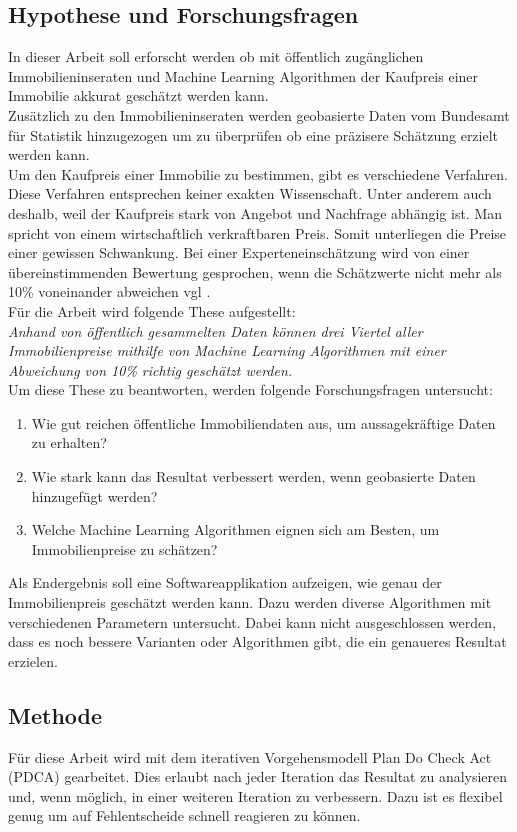 \subsection{Hypothese und Forschungsfragen}
In dieser Arbeit soll erforscht werden ob mit öffentlich zugänglichen Immobilieninseraten und Machine Learning Algorithmen der Kaufpreis einer Immobilie akkurat geschätzt werden kann.\\
Zusätzlich zu den Immobilieninseraten werden geobasierte Daten vom Bundesamt für Statistik hinzugezogen um zu überprüfen ob eine präzisere Schätzung erzielt werden kann.\\[2ex]
%
Um den Kaufpreis einer Immobilie zu bestimmen, gibt es verschiedene Verfahren. Diese Verfahren entsprechen keiner exakten Wissenschaft. Unter anderem auch deshalb, weil der Kaufpreis stark von Angebot und Nachfrage abhängig ist. Man spricht von einem wirtschaftlich verkraftbaren Preis. Somit unterliegen die Preise einer gewissen Schwankung. Bei einer Experteneinschätzung wird von einer übereinstimmenden Bewertung gesprochen, wenn die Schätzwerte nicht mehr als 10\% voneinander abweichen vgl \cite{immo_1, immo_2}.\\[2ex]
%
Für die Arbeit wird folgende These aufgestellt:\\[2ex]
\textit{Anhand von öffentlich gesammelten Daten können drei Viertel aller Immobilienpreise mithilfe von Machine Learning Algorithmen mit einer Abweichung von 10\% richtig geschätzt werden.}\\[4ex]
%
Um diese These zu beantworten, werden folgende Forschungsfragen untersucht:
\begin{enumerate}
\item Wie gut reichen öffentliche Immobiliendaten aus, um aussagekräftige Daten zu erhalten?
\item Wie stark kann das Resultat verbessert werden, wenn geobasierte Daten hinzugefügt werden?
\item Welche Machine Learning Algorithmen eignen sich am Besten, um Immobilienpreise zu schätzen?
\end{enumerate}
Als Endergebnis soll eine Softwareapplikation aufzeigen, wie genau der Immobilienpreis geschätzt werden kann. Dazu werden diverse Algorithmen mit verschiedenen Parametern untersucht. Dabei kann nicht ausgeschlossen werden, dass es noch bessere Varianten oder Algorithmen gibt, die ein genaueres Resultat erzielen.
%
\subsection{Methode}
Für diese Arbeit wird mit dem iterativen Vorgehensmodell Plan Do Check Act (PDCA) gearbeitet. Dies erlaubt nach jeder Iteration das Resultat zu analysieren und, wenn möglich, in einer weiteren Iteration zu verbessern. Dazu ist es flexibel genug um auf Fehlentscheide schnell reagieren zu können.
%
